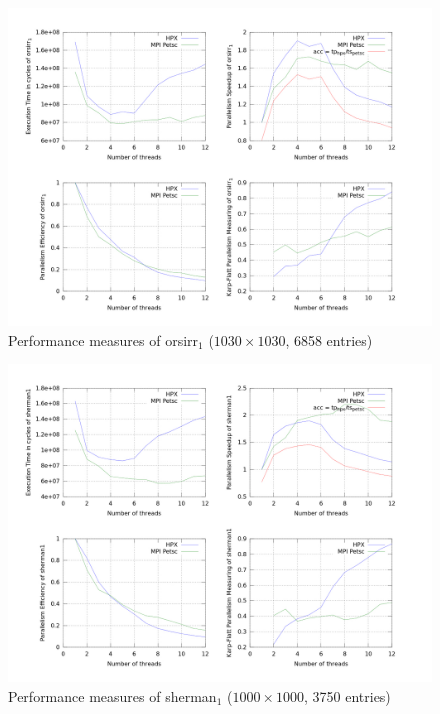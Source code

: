 \documentclass[smallextended]{svjour3}
\begin{document}
\begin{figure}[h!]
\begin{center}
\includegraphics[scale=0.25]{Images/orsirr1.jpeg}
\end{center}
\caption{Performance measures of orsirr$_1$ ($1030\times1030$, 6858 entries)}
\label{orsirr_1}
\end{figure}

\begin{figure}[h!]
\begin{center}
\includegraphics[scale=0.25]{Images/sherman1.jpeg}
\end{center}
\caption{Performance measures of sherman$_1$ ($1000\times1000$, 3750 entries)}
\label{sherman1}
\end{figure}
\end{document}
